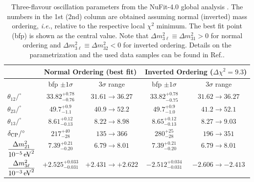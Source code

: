 \begin{table}[htbp]
    \caption{Three-flavour oscillation parameters from the NuFit-4.0 global
    analysis \cite{Esteban:2018azc}.
    The numbers in the 1st (2nd) column are obtained assuming normal (inverted) mass ordering,
    \textit{i.e.}, relative to the respective local $\chi^2$ minimum. The best fit point (bfp) is shown as the central value.
    Note that $\Delta m^2_{3\ell} \equiv \Delta m^2_{31} > 0$ for normal ordering and
    $\Delta m^2_{3\ell} \equiv \Delta m^2_{32} < 0$ for inverted ordering. Details on the parametrization and the used data samples can be found in Ref.\cite{Esteban:2018azc}.}
    \label{tab:NuFit-results}
    \vspace*{3mm}
    \centering
        \begin{tabular}{l|cc|cc}
      \hline\hline
      &
      \multicolumn{2}{c|}{Normal Ordering (best fit)} &
      \multicolumn{2}{c}{Inverted Ordering ($\Delta\chi^2=9.3$)}
      \\
      \hline
      & bfp $\pm 1\sigma$ & $3\sigma$ range
      & bfp $\pm 1\sigma$ & $3\sigma$ range
      \\ \hline
      \rule{0pt}{5mm}\ignorespaces
      $\theta_{12}/^\circ$
      & $33.82_{-0.76}^{+0.78}$ & $31.61 \to 36.27$
      & $33.82_{-0.75}^{+0.78}$ & $31.62 \to 36.27$
      \\[2mm]
      $\theta_{23}/^\circ$
      & $49.7_{-1.1}^{+0.9}$ & $40.9 \to 52.2$
      & $49.7_{-1.0}^{+0.9}$ & $41.2 \to 52.1$
      \\[2mm]
      $\theta_{13}/^\circ$
      & $8.61_{-0.13}^{+0.12}$ & $8.22 \to 8.98$
      & $8.65_{-0.13}^{+0.12}$ & $8.27 \to 9.03$
      \\[2mm]
      $\delta_{\rm CP}/^\circ$
      & $217_{-28}^{+40}$ & $135 \to 366$
      & $280_{-28}^{+25}$ & $196 \to 351$
      \\[2mm]
      $\dfrac{\Delta m^2_{21}}{10^{-5}\, {\rm eV}^2}$
      & $7.39_{-0.20}^{+0.21}$ & $6.79 \to 8.01$
      & $7.39_{-0.20}^{+0.21}$ & $6.79 \to 8.01$
      \\[2mm]
      $\dfrac{\Delta m^2_{3\ell}}{10^{-3} \,{\rm eV}^2}$
      & $+2.525_{-0.031}^{+0.033}$ & $+2.431 \to +2.622$
      & $-2.512_{-0.031}^{+0.034}$ & $-2.606 \to -2.413$
      \\[2mm]
      \hline\hline
    \end{tabular}
\end{table}

